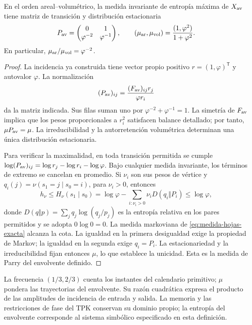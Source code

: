 \begin{proposition}
En el orden areal--volumétrico, la medida invariante de entropía máxima
de \(X_{\rm av}\) tiene matriz de transición y distribución estacionaria
\begin{equation}
 P_{\rm av}=\begin{pmatrix}0&1\\\varphi^{-2}&\varphi^{-1}\end{pmatrix},
 \qquad
 (\mu_{\rm ar},\mu_{\rm vol})
 =\frac{(1,\varphi^2)}{1+\varphi^2}.
 \label{eq:medida-hojas-exacta}
\end{equation}
En particular, \(\mu_{\rm ar}/\mu_{\rm vol}=\varphi^{-2}\).
\end{proposition}
\begin{proof}
La incidencia ya construida tiene vector propio positivo
\(r=(1,\varphi)^{\mathsf T}\) y autovalor \(\varphi\). La
normalización
\[
 (P_{\rm av})_{ij}
 =\frac{(F_{\rm av})_{ij}r_j}{\varphi r_i}
\]
da la matriz indicada. Sus filas suman uno por
\(\varphi^{-2}+\varphi^{-1}=1\). La simetría de \(F_{\rm av}\)
implica que los pesos proporcionales a \(r_i^2\) satisfacen balance
detallado; por tanto, \(\mu P_{\rm av}=\mu\). La irreducibilidad y la
autorretención volumétrica determinan una única distribución estacionaria.

Para verificar la maximalidad, en toda transición permitida se cumple
\(\log(P_{\rm av})_{ij}=\log r_j-\log r_i-\log\varphi\).
Bajo cualquier medida invariante, los términos de extremo se cancelan
en promedio. Si \(\nu_i\) son sus pesos de vértice y
\(q_i(j)=\nu(s_1=j\mid s_0=i)\), para \(\nu_i>0\), entonces
\[
 h_\nu\leq H_\nu(s_1\mid s_0)
 =\log\varphi-\sum_{i:\nu_i>0}\nu_iD(q_i\Vert P_i)
 \leq\log\varphi,
\]
donde \(D(q\Vert p)=\sum_jq_j\log(q_j/p_j)\) es la entropía
relativa en los pares permitidos y se adopta \(0\log0=0\).
La medida markoviana de \eqref{eq:medida-hojas-exacta} alcanza la cota.
La igualdad en la primera desigualdad exige la propiedad de Markov;
la igualdad en la segunda exige \(q_i=P_i\). La estacionariedad y
la irreducibilidad fijan entonces \(\mu\), lo que establece la
unicidad. Esta es la medida de Parry del envolvente definido.
\end{proof}

La frecuencia \((1/3,2/3)\) cuenta los instantes del calendario primitivo;
\(\mu\) pondera las trayectorias del envolvente. Su razón cuadrática
expresa el producto de las amplitudes de incidencia de entrada y salida.
La memoria y las restricciones de fase del TPK conservan su dominio
propio; la entropía del envolvente corresponde al sistema simbólico
especificado en esta definición.

